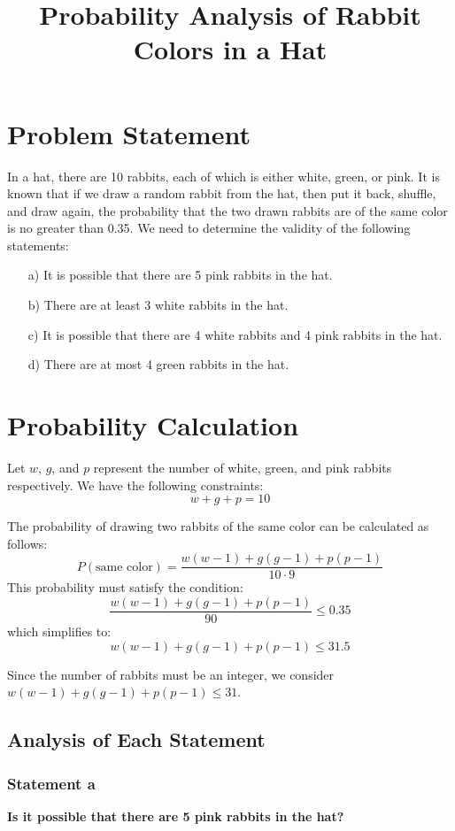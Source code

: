 \documentclass{article}
\title{Probability Analysis of Rabbit Colors in a Hat}
\author{}
\date{}
\begin{document}
\maketitle

\section{Problem Statement}
In a hat, there are 10 rabbits, each of which is either white, green, or pink. It is known that if we draw a random rabbit from the hat, then put it back, shuffle, and draw again, the probability that the two drawn rabbits are of the same color is no greater than 0.35. We need to determine the validity of the following statements:

\begin{itemize}
    \item[a)] It is possible that there are 5 pink rabbits in the hat.
    \item[b)] There are at least 3 white rabbits in the hat.
    \item[c)] It is possible that there are 4 white rabbits and 4 pink rabbits in the hat.
    \item[d)] There are at most 4 green rabbits in the hat.
\end{itemize}

\section{Probability Calculation}
Let \( w \), \( g \), and \( p \) represent the number of white, green, and pink rabbits respectively. We have the following constraints:
\[
w + g + p = 10
\]

The probability of drawing two rabbits of the same color can be calculated as follows:
\[
P(\text{same color}) = \frac{w(w-1) + g(g-1) + p(p-1)}{10 \cdot 9}
\]
This probability must satisfy the condition:
\[
\frac{w(w-1) + g(g-1) + p(p-1)}{90} \leq 0.35
\]
which simplifies to:
\[
w(w-1) + g(g-1) + p(p-1) \leq 31.5
\]

Since the number of rabbits must be an integer, we consider \( w(w-1) + g(g-1) + p(p-1) \leq 31 \).

\subsection{Analysis of Each Statement}
\subsubsection{Statement a}
\textbf{Is it possible that there are 5 pink rabbits in the hat?}
\end{document}
